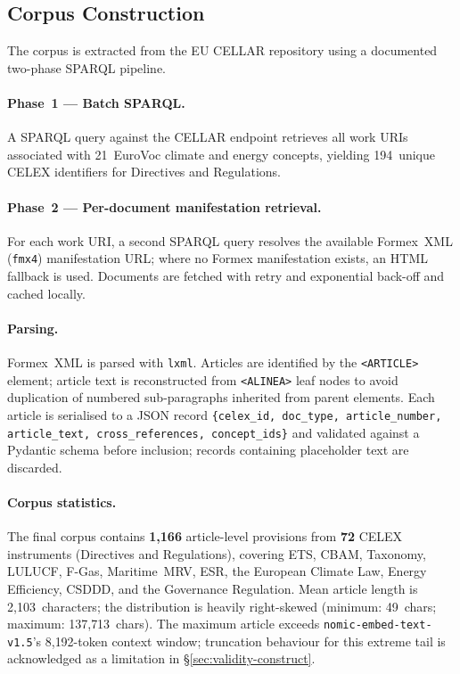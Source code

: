 \documentclass[sigconf,screen]{acmart}
\newcommand{\nomic}{\texttt{nomic-embed-text-v1.5}\xspace}
\begin{document}
\subsection{Corpus Construction}
\label{sec:corpus}

The corpus is extracted from the EU CELLAR repository using a
documented two-phase SPARQL pipeline.

\paragraph{Phase~1 --- Batch SPARQL.}
A SPARQL query against the CELLAR endpoint retrieves all work URIs
associated with 21~EuroVoc climate and energy concepts, yielding
194~unique CELEX identifiers for Directives and Regulations.

\paragraph{Phase~2 --- Per-document manifestation retrieval.}
For each work URI, a second SPARQL query resolves the available
Formex~XML (\texttt{fmx4}) manifestation URL; where no Formex
manifestation exists, an HTML fallback is used.  Documents are
fetched with retry and exponential back-off and cached locally.

\paragraph{Parsing.}
Formex~XML is parsed with \texttt{lxml}.  Articles are identified by
the \texttt{<ARTICLE>} element; article text is reconstructed from
\texttt{<ALINEA>} leaf nodes to avoid duplication of numbered
sub-paragraphs inherited from parent elements.  Each article is
serialised to a JSON record \texttt{\{celex\_id, doc\_type,
article\_number, article\_text, cross\_references, concept\_ids\}}
and validated against a Pydantic schema before inclusion; records
containing placeholder text are discarded.

\paragraph{Corpus statistics.}
The final corpus contains \textbf{1{,}166} article-level provisions
from \textbf{72} CELEX instruments (Directives and Regulations),
covering ETS, CBAM, Taxonomy, LULUCF, F-Gas, Maritime~MRV, ESR, the
European Climate Law, Energy Efficiency, CSDDD, and the Governance
Regulation.  Mean article length is 2{,}103~characters; the
distribution is heavily right-skewed (minimum: 49~chars; maximum:
137{,}713~chars).  The maximum article exceeds \nomic's
8{,}192-token context window; truncation behaviour for this extreme
tail is acknowledged as a limitation in \S\ref{sec:validity-construct}.
\end{document}
